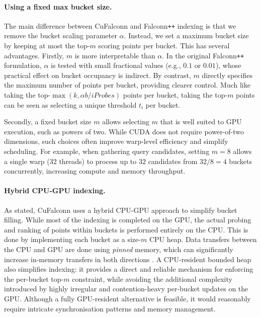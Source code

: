 \documentclass{article}
\newcommand{\ip}{iProbes\xspace}
\newcommand{\cf}{CuFalconn\xspace}
\newcommand{\fpp}{Falconn\texttt{++}\xspace}
\begin{document}
\paragraph{Using a fixed max bucket size.}

The main difference between \cf and \fpp indexing is that we remove the bucket scaling parameter $\alpha$. Instead, we set a maximum bucket size by keeping at most the top-$m$ scoring points per bucket. This has several advantages. Firstly, $m$ is more interpretable than $\alpha$. In the original \fpp formulation, $\alpha$ is tested with small fractional values (e.g., $0.1$ or $0.01$), whose practical effect on bucket occupancy is indirect. By contrast, $m$ directly specifies the maximum number of points per bucket, providing clearer control. Much like taking the top-$\max(k, \alpha b / \ip)$ points per bucket, taking the top-$m$ points can be seen as selecting a unique threshold $t_i$ per bucket. 

Secondly, a fixed bucket size $m$ allows selecting $m$ that is well suited to GPU execution, such as powers of two. While CUDA does not require power-of-two dimensions, such choices often improve warp-level efficiency and simplify scheduling. For example, when gathering query candidates, setting $m=8$ allows a single warp (32 threads) to process up to $32$ candidates from $32/8 = 4$ buckets concurrently, increasing compute and memory throughput. 

\paragraph{Hybrid CPU-GPU indexing.}

As stated, \cf uses a hybrid CPU-GPU approach to simplify bucket filling. While most of the indexing is completed on the GPU, the actual probing and ranking of points within buckets is performed entirely on the CPU. This is done by implementing each bucket as a size-$m$ CPU heap. Data transfers between the CPU and GPU are done using \emph{pinned} memory, which can significantly increase in-memory transfers in both directions \cite{pytorch_pinmem_nonblock}. A CPU-resident bounded heap also simplifies indexing: it provides a direct and reliable mechanism for enforcing the per-bucket top-$m$ constraint, while avoiding the additional complexity introduced by highly irregular and contention-heavy per-bucket updates on the GPU. Although a fully GPU-resident alternative is feasible, it would reasonably require intricate synchronisation patterns and memory management.
\end{document}
